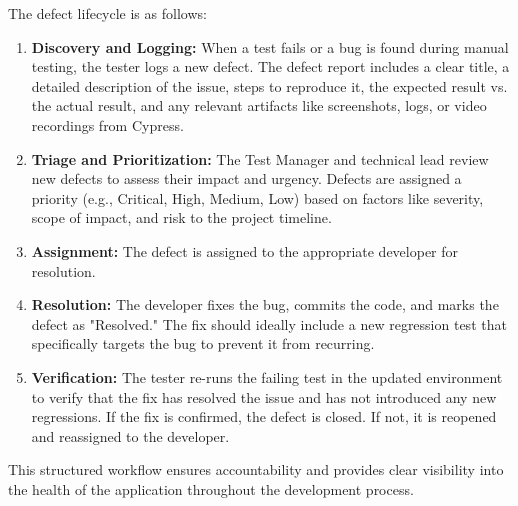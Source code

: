 The defect lifecycle is as follows:
\begin{enumerate}
    \item \textbf{Discovery and Logging:} When a test fails or a bug is found during manual testing, the tester logs a new defect. The defect report includes a clear title, a detailed description of the issue, steps to reproduce it, the expected result vs. the actual result, and any relevant artifacts like screenshots, logs, or video recordings from Cypress.
    \item \textbf{Triage and Prioritization:} The Test Manager and technical lead review new defects to assess their impact and urgency. Defects are assigned a priority (e.g., Critical, High, Medium, Low) based on factors like severity, scope of impact, and risk to the project timeline.
    \item \textbf{Assignment:} The defect is assigned to the appropriate developer for resolution.
    \item \textbf{Resolution:} The developer fixes the bug, commits the code, and marks the defect as "Resolved." The fix should ideally include a new regression test that specifically targets the bug to prevent it from recurring.
    \item \textbf{Verification:} The tester re-runs the failing test in the updated environment to verify that the fix has resolved the issue and has not introduced any new regressions. If the fix is confirmed, the defect is closed. If not, it is reopened and reassigned to the developer.
\end{enumerate}
This structured workflow ensures accountability and provides clear visibility into the health of the application throughout the development process.

